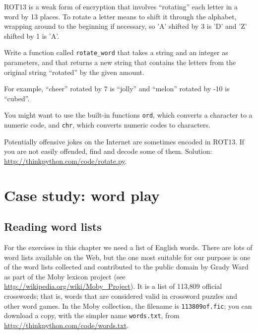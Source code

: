 \documentclass[10pt]{book}
\begin{document}
\begin{exercise}

\label{exrotate}
ROT13 is a weak form of encryption that involves ``rotating'' each
letter in a word by 13 places.  To rotate a letter means
to shift it through the alphabet, wrapping around to the beginning if
necessary, so 'A' shifted by 3 is 'D' and 'Z' shifted by 1 is 'A'.

Write a function called \verb"rotate_word"
that takes a string and an integer as parameters, and that returns
a new string that contains the letters from the original string
``rotated'' by the given amount.  

For example, ``cheer'' rotated by 7 is ``jolly'' and ``melon'' rotated
by -10 is ``cubed''.  


You might want to use the built-in functions {\tt ord}, which converts
a character to a numeric code, and {\tt chr}, which converts numeric
codes to characters.

Potentially offensive jokes on the Internet are sometimes encoded
in ROT13.  If you are not easily offended, find and decode some
of them.  Solution: \url{http://thinkpython.com/code/rotate.py}.

\end{exercise}


\chapter{Case study: word play}

\section{Reading word lists}
\label{wordlist}

For the exercises in this chapter we need a list of English words.
There are lots of word lists available on the Web, but the one most
suitable for our purpose is one of the word lists collected and
contributed to the public domain by Grady Ward as part of the Moby
lexicon project (see \url{http://wikipedia.org/wiki/Moby_Project}).  It
is a list of 113,809 official crosswords; that is, words that are
considered valid in crossword puzzles and other word games.  In the
Moby collection, the filename is {\tt 113809of.fic}; you can download
a copy, with the simpler name {\tt words.txt}, from
\url{http://thinkpython.com/code/words.txt}.
\end{document}
